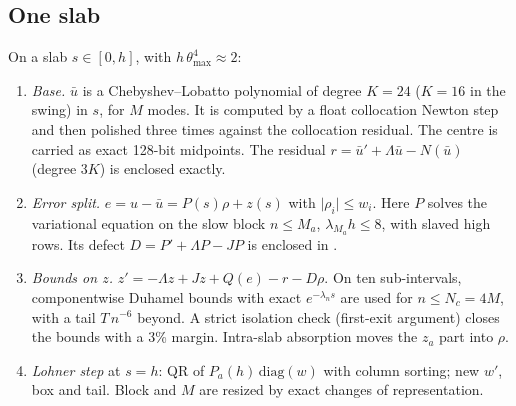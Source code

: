 \documentclass[11pt]{article}
\theoremstyle{definition}
\theoremstyle{remark}
\newcommand{\fn}[1]{\texttt{\detokenize{#1}}}
\newcommand{\abs}[1]{\lvert #1\rvert}
\begin{document}
\subsection{One slab}
On a slab $s\in[0,h]$, with $h\,\theta_{\max}^4\approx2$:
\begin{enumerate}[label=(\arabic*),leftmargin=*]
\item \emph{Base.} $\bar u$ is a Chebyshev--Lobatto polynomial of degree $K=24$ ($K=16$ in the swing) in $s$, for $M$ modes. It is computed by a float collocation Newton step and then polished three times against the \fn{arb} collocation residual. The centre is carried as exact 128-bit midpoints. The residual $r=\bar u'+\Lambda\bar u-N(\bar u)$ (degree $3K$) is enclosed exactly.
\item \emph{Error split.} $e=u-\bar u=P(s)\rho+z(s)$ with $\abs{\rho_i}\le w_i$. Here $P$ solves the variational equation on the slow block $n\le M_a$, $\lambda_{M_a}h\le8$, with slaved high rows. Its defect $D=P'+\Lambda P-JP$ is enclosed in \fn{arb}.
\item \emph{Bounds on $z$.} $z'=-\Lambda z+Jz+Q(e)-r-D\rho$. On ten sub-intervals, componentwise Duhamel bounds with exact $e^{-\lambda_ns}$ are used for $n\le N_c=4M$, with a tail $T\,n^{-6}$ beyond. A strict \fn{arb} isolation check (first-exit argument) closes the bounds with a 3\% margin. Intra-slab absorption moves the $z_a$ part into $\rho$.
\item \emph{Lohner step} at $s=h$: QR of $P_a(h)\,\mathrm{diag}(w)$ with column sorting; new $w'$, box and tail. Block and $M$ are resized by exact changes of representation.
\end{enumerate}
\end{document}

